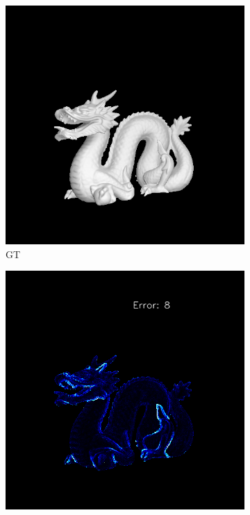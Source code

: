 \begin{figure}[th]
	
	\begin{subfigure}[b]{0.24\linewidth}
		\includegraphics[width=\linewidth]{./Figures/comparison_512/fancy_eval_14_img.png}
		\caption{GT}
	\end{subfigure}
	\begin{subfigure}[b]{0.24\linewidth}
		\includegraphics[width=\linewidth]{./Figures/comparison_512/fancy_eval_14_error_SVD.png}

\end{subfigure}
\end{figure}

